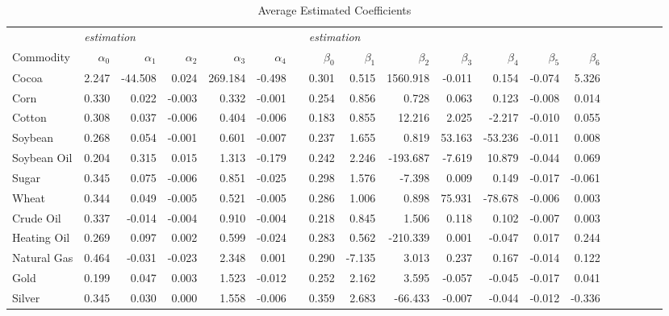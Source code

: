 \documentclass[12pt,a4paper]{article}
\providecommand{\tabularnewline}{\\}
\begin{document}
\begin{table}[!htbp]
\tabcolsep 0.035in
\caption{Average Estimated Coefficients}\label{tab:Estimated_Coefficients}
\begin{centering}
\begin{tabular}{@{}lrrrrrrrrrrrrrrrrrr@{}}
\toprule
 & \multicolumn{5}{l}{\footnotesize \textit{\cite{goncalves2006predictable} estimation}} &  & \multicolumn{7}{l}{\footnotesize \textit{\cite{chalamandaris2011important} estimation}}\tabularnewline
\cline{2-6} \cline{8-14} 
\footnotesize{Commodity} & \textit{$\alpha_{0}$} & \textit{$\alpha_{1}$} & \textit{$\alpha_{2}$} & \textit{$\alpha_{3}$} & \textit{$\alpha_{4}$} &  & {$\beta_{0}$} & {$\beta_{1}$} & {$\beta_{2}$} & {$\beta_{3}$} & {$\beta_{4}$} & {$\beta_{5}$} & {$\beta_{6}$}\tabularnewline
\midrule 
\footnotesize{Cocoa} & 2.247 & -44.508 & 0.024 & 269.184 & -0.498 &  & 0.301 & 0.515 & 1560.918 & -0.011 & 0.154 & -0.074 & 5.326\tabularnewline
\footnotesize{Corn} & 0.330 & 0.022 & -0.003 & 0.332 & -0.001 &  & 0.254 & 0.856 & 0.728 & 0.063 & 0.123 & -0.008 & 0.014\tabularnewline
\footnotesize{Cotton} & 0.308 & 0.037 & -0.006 & 0.404 & -0.006 &  & 0.183 & 0.855 & 12.216 & 2.025 & -2.217 & -0.010 & 0.055\tabularnewline
\footnotesize{Soybean} & 0.268 & 0.054 & -0.001 & 0.601 & -0.007 &  & 0.237 & 1.655 & 0.819 & 53.163 & -53.236 & -0.011 & 0.008\tabularnewline
\footnotesize{Soybean Oil} & 0.204 & 0.315 & 0.015 & 1.313 & -0.179 &  & 0.242 & 2.246 & -193.687 & -7.619 & 10.879 & -0.044 & 0.069\tabularnewline
\footnotesize{Sugar} & 0.345 & 0.075 & -0.006 & 0.851 & -0.025 &  & 0.298 & 1.576 & -7.398 & 0.009 & 0.149 & -0.017 & -0.061\tabularnewline
\footnotesize{Wheat} & 0.344 & 0.049 & -0.005 & 0.521 & -0.005 &  & 0.286 & 1.006 & 0.898 & 75.931 & -78.678 & -0.006 & 0.003\tabularnewline
\footnotesize{Crude Oil} & 0.337 & -0.014 & -0.004 & 0.910 & -0.004 &  & 0.218 & 0.845 & 1.506 & 0.118 & 0.102 & -0.007 & 0.003\tabularnewline
\footnotesize{Heating Oil} & 0.269 & 0.097 & 0.002 & 0.599 & -0.024 &  & 0.283 & 0.562 & -210.339 & 0.001 & -0.047 & 0.017 & 0.244\tabularnewline
\footnotesize{Natural Gas} & 0.464 & -0.031 & -0.023 & 2.348 & 0.001 &  & 0.290 & -7.135 & 3.013 & 0.237 & 0.167 & -0.014 & 0.122\tabularnewline
\footnotesize{Gold} & 0.199 & 0.047 & 0.003 & 1.523 & -0.012 &  & 0.252 & 2.162 & 3.595 & -0.057 & -0.045 & -0.017 & 0.041\tabularnewline
\footnotesize{Silver} & 0.345 & 0.030 & 0.000 & 1.558 & -0.006 &  & 0.359 & 2.683 & -66.433 & -0.007 & -0.044 & -0.012 & -0.336\tabularnewline
\bottomrule
\end{tabular}
\par\end{centering}
\end{table}
\end{document}

